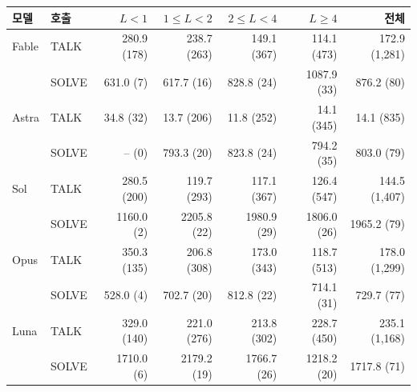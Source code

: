 \begin{tabular*}{\textwidth}{@{\extracolsep{\fill}}llrrrrr@{}}
\toprule
모델 & 호출 & $L<1$ & $1\leq L<2$ & $2\leq L<4$ & $L\geq4$ & 전체 \\
\midrule
Fable & TALK & 280.9 (178) & 238.7 (263) & 149.1 (367) & 114.1 (473) & 172.9 (1,281) \\
 & SOLVE & 631.0 (7) & 617.7 (16) & 828.8 (24) & 1087.9 (33) & 876.2 (80) \\
\addlinespace[2pt]
Astra & TALK & 34.8 (32) & 13.7 (206) & 11.8 (252) & 14.1 (345) & 14.1 (835) \\
 & SOLVE & -- (0) & 793.3 (20) & 823.8 (24) & 794.2 (35) & 803.0 (79) \\
\addlinespace[2pt]
Sol & TALK & 280.5 (200) & 119.7 (293) & 117.1 (367) & 126.4 (547) & 144.5 (1,407) \\
 & SOLVE & 1160.0 (2) & 2205.8 (22) & 1980.9 (29) & 1806.0 (26) & 1965.2 (79) \\
\addlinespace[2pt]
Opus & TALK & 350.3 (135) & 206.8 (308) & 173.0 (343) & 118.7 (513) & 178.0 (1,299) \\
 & SOLVE & 528.0 (4) & 702.7 (20) & 812.8 (22) & 714.1 (31) & 729.7 (77) \\
\addlinespace[2pt]
Luna & TALK & 329.0 (140) & 221.0 (276) & 213.8 (302) & 228.7 (450) & 235.1 (1,168) \\
 & SOLVE & 1710.0 (6) & 2179.2 (19) & 1766.7 (26) & 1218.2 (20) & 1717.8 (71) \\
\bottomrule
\end{tabular*}
